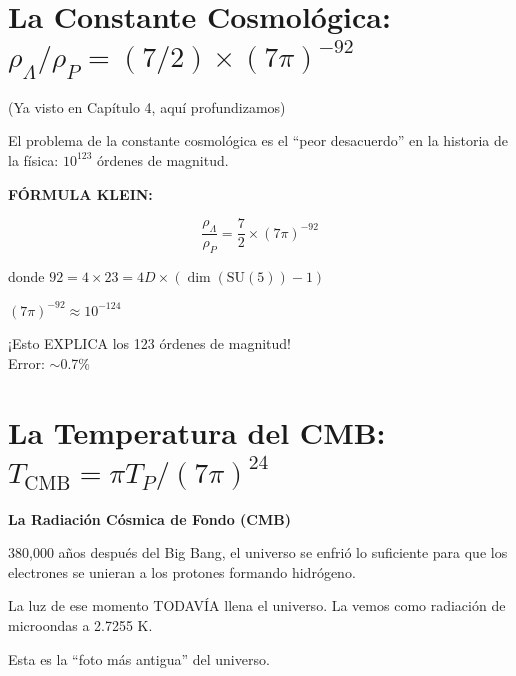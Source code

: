\section{La Constante Cosmológica: $\rho_\Lambda/\rho_P = (7/2) \times (7\pi)^{-92}$}

(Ya visto en Capítulo 4, aquí profundizamos)

\begin{tcolorbox}[colback=kleingray, colframe=kleinblue]
El problema de la constante cosmológica es el ``peor desacuerdo''
en la historia de la física: $10^{123}$ órdenes de magnitud.

\textbf{FÓRMULA KLEIN:}

\begin{equation}
\boxed{\frac{\rho_\Lambda}{\rho_P} = \frac{7}{2} \times (7\pi)^{-92}}
\end{equation}

donde $92 = 4 \times 23 = 4D \times (\dim(\text{SU}(5)) - 1)$

$(7\pi)^{-92} \approx 10^{-124}$

¡Esto EXPLICA los 123 órdenes de magnitud!\\
Error: $\sim$0.7\%
\end{tcolorbox}


\section{La Temperatura del CMB: $T_{\text{CMB}} = \pi T_P / (7\pi)^{24}$}

\begin{nivelconceptual}
\textbf{La Radiación Cósmica de Fondo (CMB)}

380,000 años después del Big Bang, el universo se enfrió lo suficiente
para que los electrones se unieran a los protones formando hidrógeno.

La luz de ese momento TODAVÍA llena el universo.
La vemos como radiación de microondas a 2.7255 K.

Esta es la ``foto más antigua'' del universo.
\end{nivelconceptual}


